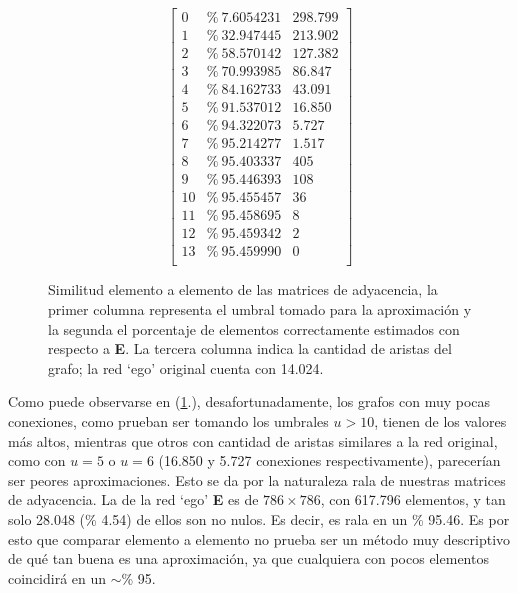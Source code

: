 \begin{figure}[!htbp]
\begin{equation*}
    \begin{bmatrix}
    0  &\%\ 7.6054231  &298.799 \\
    1  &\%\ 32.947445  &213.902\\
    2  &\%\ 58.570142   &127.382\\
    3  &\%\ 70.993985    &86.847\\
    4  &\%\ 84.162733   &43.091\\
    5  &\%\ 91.537012   &16.850 \\
    6  &\%\ 94.322073   &5.727\\
    7  &\%\ 95.214277   &1.517\\
    8  &\%\ 95.403337   &405\\
    9  &\%\ 95.446393   &108 \\
    10 &\%\ 95.455457   &36\\
    11 &\%\ 95.458695   &8\\  
    12 &\%\ 95.459342   &2\\
    13 &\%\ 95.459990   &0\\
    \end{bmatrix}
\end{equation*}
\caption{Similitud elemento a elemento de las matrices de adyacencia, la primer columna representa el umbral tomado para la aproximación y la segunda el porcentaje de elementos correctamente estimados con respecto a \textbf{E}. La tercera columna indica la cantidad de aristas del grafo; la red `ego' original cuenta con 14.024.} \label{promedio_similaridad}
\end{figure}

Como puede observarse en (\ref{promedio_similaridad}.), desafortunadamente, los grafos con muy pocas conexiones, como prueban ser tomando los umbrales $u > 10$, tienen de los valores más altos, mientras que otros con cantidad de aristas similares a la red original, como con $u = 5$ o $u = 6$ (16.850 y 5.727 conexiones respectivamente), parecerían ser peores aproximaciones. Esto se da por la naturaleza rala de nuestras matrices de adyacencia. La de la red `ego' \textbf{E} es de $786 \times 786$, con 617.796 elementos, y tan solo 28.048 (\% 4.54) de ellos son no nulos. Es decir, es rala en un \% 95.46. Es por esto que comparar elemento a elemento no prueba ser un método muy descriptivo de qué tan buena es una aproximación, ya que cualquiera con pocos elementos coincidirá en un $\sim$\% 95.

